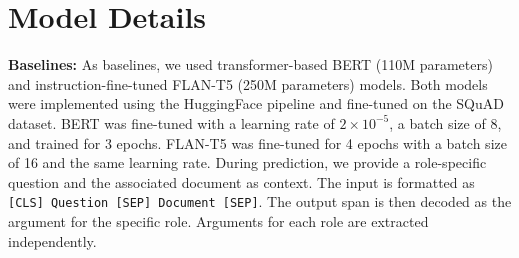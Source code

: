 \section{Model Details}
\label{appendix: models}
\textbf{Baselines:} As baselines, we used transformer-based BERT (110M parameters) and instruction-fine-tuned FLAN-T5 (250M parameters) models. Both models were implemented using the HuggingFace pipeline and fine-tuned on the SQuAD \cite{rajpurkar-etal-2016-squad} dataset. BERT was fine-tuned with a learning rate of $2 \times 10^{-5}$, a batch size of 8, and trained for 3 epochs. FLAN-T5 was fine-tuned for 4 epochs with a batch size of 16 and the same learning rate. During prediction, we provide a role-specific question and the associated document as context. The input is formatted as \texttt{[CLS] Question [SEP] Document [SEP]}. The output span is then decoded as the argument for the specific role. Arguments for each role are extracted independently.


